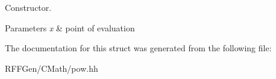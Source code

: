 Constructor. 


\begin{DoxyParams}{Parameters}
{\em x} & point of evaluation \\
\hline
\end{DoxyParams}


The documentation for this struct was generated from the following file\-:\begin{DoxyCompactItemize}
\item 
R\-F\-F\-Gen/\-C\-Math/pow.\-hh\end{DoxyCompactItemize}
